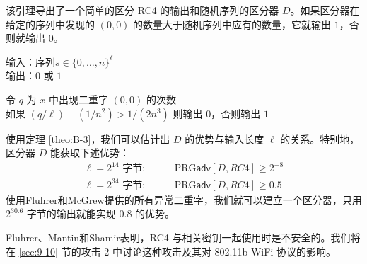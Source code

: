 该引理导出了一个简单的区分 RC4 的输出和随机序列的区分器 $D$。如果区分器在给定的序列中发现的 $(0,0)$ 的数量大于随机序列中应有的数量，它就输出 $1$，否则就输出 $0$。

\vspace*{5pt}

\hspace*{5pt} 输入：序列$s\in\{0,\dots,n\}^\ell$\\
\hspace*{26pt} 输出：$0$ 或 $1$

\vspace{3pt}

\hspace*{5pt} 令 $q$ 为 $x$ 中出现二重字 $(0,0)$ 的次数\\
\hspace*{26pt} 如果 $(q/\ell)-(1/n^2)>1/(2n^3)$ 则输出 $0$，否则输出 $1$

\vspace*{5pt}

使用定理 \ref{theo:B-3}，我们可以估计出 $D$ 的优势与输入长度 $\ell$ 的关系。特别地，区分器 $D$ 能获取下述优势：
\[
\begin{aligned}
\ell=2^{14}\text{ 字节}: &\quad\quad \mathrm{PRG}\mathsf{adv}[D,RC4]\geq2^{-8}\\
\ell=2^{34}\text{ 字节}: &\quad\quad \mathrm{PRG}\mathsf{adv}[D,RC4]\geq0.5
\end{aligned}
\]
使用Fluhrer和McGrew提供的所有异常二重字，我们就可以建立一个区分器，只用 $2^{30.6}$ 字节的输出就能实现 $0.8$ 的优势。

\begin{snote}
Fluhrer、Mantin和Shamir表明，RC4 与相关密钥一起使用时是不安全的。我们将在 \ref{sec:9-10} 节的攻击 $2$ 中讨论这种攻击及其对 802.11b WiFi 协议的影响。
\end{snote}






















































